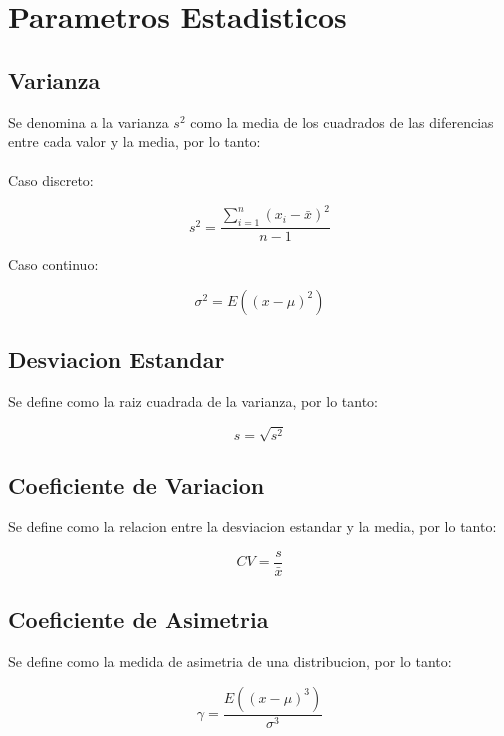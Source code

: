 \section{Parametros Estadisticos}

\subsection{Varianza}

Se denomina a la varianza \textbf{$s^2$} como la media de los cuadrados de las diferencias entre cada valor y la media, por lo tanto:
\\ \\
Caso discreto: 

\begin{equation}
    s^2 = \frac{\sum_{i=1}^{n} (x_i - \bar{x})^2}{n-1}
\end{equation}

Caso continuo:

\begin{equation}
    \sigma^2 = E((x-\mu)^2)
\end{equation}

\subsection{Desviacion Estandar}

Se define como la raiz cuadrada de la varianza, por lo tanto:

\begin{equation}
    s = \sqrt{s^2}
\end{equation}

\subsection{Coeficiente de Variacion}

Se define como la relacion entre la desviacion estandar y la media, por lo tanto:

\begin{equation}
    CV = \frac{s}{\bar{x}}
\end{equation}

\subsection{Coeficiente de Asimetria}

Se define como la medida de asimetria de una distribucion, por lo tanto:

\begin{equation}
    \gamma = \frac{E((x-\mu)^3)}{\sigma^3}
\end{equation}

